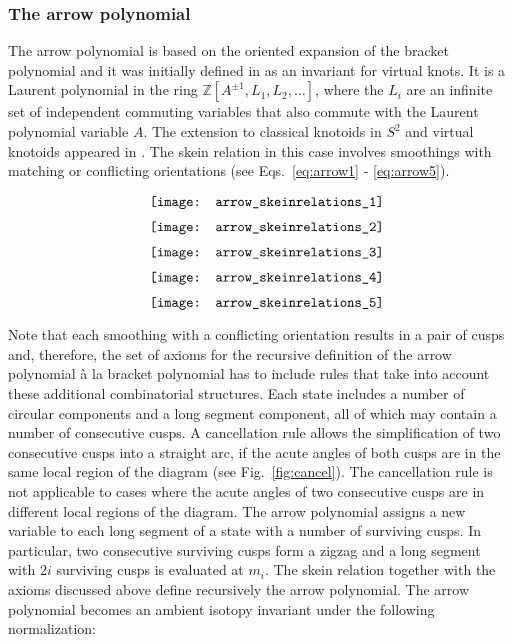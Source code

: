 \subsubsection{The arrow polynomial}

The arrow polynomial is based on the oriented expansion of the bracket polynomial and it was initially  defined in \cite{dye2009} as an invariant for virtual knots. It is a Laurent polynomial in the ring $\mathbb{Z}[A^{\pm1}, L_1, L_2, \ldots ]$, where the $L_i$ are an infinite set of independent commuting variables that also commute with the
Laurent polynomial variable $A$. The extension to classical knotoids in $S^2$ and virtual knotoids appeared in \cite{guka}. The skein relation in this case involves  smoothings with matching or conflicting orientations (see Eqs.~\ref{eq:arrow1} - \ref{eq:arrow5}).
\begin{eqnarray}
&&\raisebox{-0.5\height}{\texttt{[image: arrow\_skeinrelations\_1]}} \label{eq:arrow1}\\
&&\raisebox{-0.5\height}{\texttt{[image: arrow\_skeinrelations\_2]}}\label{eq:arrow2}\\
&&\raisebox{-0.5\height}{\texttt{[image: arrow\_skeinrelations\_3]}}\label{eq:arrow3}\\
&&\raisebox{-0.5\height}{\texttt{[image: arrow\_skeinrelations\_4]}}\label{eq:arrow4}\\
&&\raisebox{-0.5\height}{\texttt{[image: arrow\_skeinrelations\_5]}}\label{eq:arrow5}
\end{eqnarray}


 Note that each smoothing with a conflicting orientation results in a pair of cusps and, therefore, the set of axioms  for the recursive definition of the arrow polynomial \`{a} la bracket polynomial has to include rules that take into account these additional combinatorial structures. Each state includes a number of circular components and a long segment component, all of which may contain a number of consecutive cusps. A cancellation rule allows the simplification of two consecutive cusps into a straight arc, if the acute angles of both cusps are in the same local region of the diagram (see Fig.~\ref{fig:cancel}). The cancellation rule is not applicable to cases where the acute angles of two consecutive cusps are in different local regions of the diagram. 
 The arrow polynomial assigns a new variable to each long segment of a state with a number of surviving cusps. In particular, two consecutive surviving cusps form a zigzag and a long segment with $2i$ surviving cusps is evaluated at $m_i$. The skein relation together with the axioms discussed above define recursively the arrow polynomial. The arrow polynomial becomes an ambient isotopy invariant under the following normalization:

